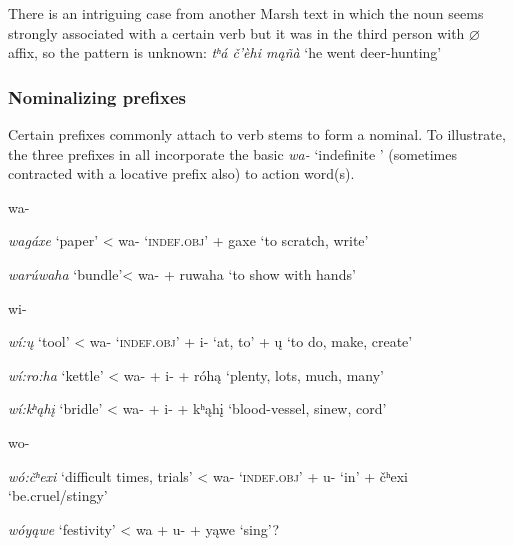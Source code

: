 \documentclass[output=paper]{LSP/langsci}
\begin{document}
There is an intriguing case from another Marsh text in which the noun seems strongly associated with a certain verb but it was in the third person with $\varnothing$ affix, so the  pattern is unknown: \textit{tʰá \v{c}'\`ehi m\k{a}ñà} `he went deer-hunting' \citep[``The Wanderer'' LN47]{Marsh1936}

\subsubsection{Nominalizing prefixes} 
Certain prefixes commonly attach to verb stems to form a nominal.  To illustrate, the three prefixes in  all incorporate the basic \textit{wa-} `indefinite ' (sometimes contracted with a locative prefix also) to action word(s).

\begin{exe}
\ex \label{wawiwo}
\begin{xlist}
\ex wa-     	       											
	       	
\textit{wagáxe}       `paper'  < wa- `\textsc{indef.obj}' + gaxe `to scratch, write'
		
\textit{warúwaha}  `bundle'< wa-  + ruwaha `to show with hands'
            
\ex wi-															

\textit{w\'i:\k{u}}    `tool'    < wa- `\textsc{indef.obj}' + i- `at, to' + \k{u} `to do, make, create'
            
\textit{w\'i:ro:ha}  `kettle' < wa- + i-  + róh\k{a} `plenty, lots, much, many'

\textit{w\'i:kʰ\k{a}h\k{i}} `bridle'  < wa- + i-  + kʰ\k{a}h\k{i} `blood-vessel, sinew, cord' \citep[``The Outsider'' LN65]{Marsh1936}\footnotemark

\ex wo-  															

\textit{wó:\v{c}ʰexi}   `difficult times, trials' < wa- `\textsc{indef.obj}' + u- `in' + \v{c}ʰexi `be.cruel/stingy'
	
\textit{wóy\k{a}we}  `festivity' < wa + u- + y\k{a}we `sing'? \footnotemark
\end{xlist}
\end{exe}
 
\end{document}
